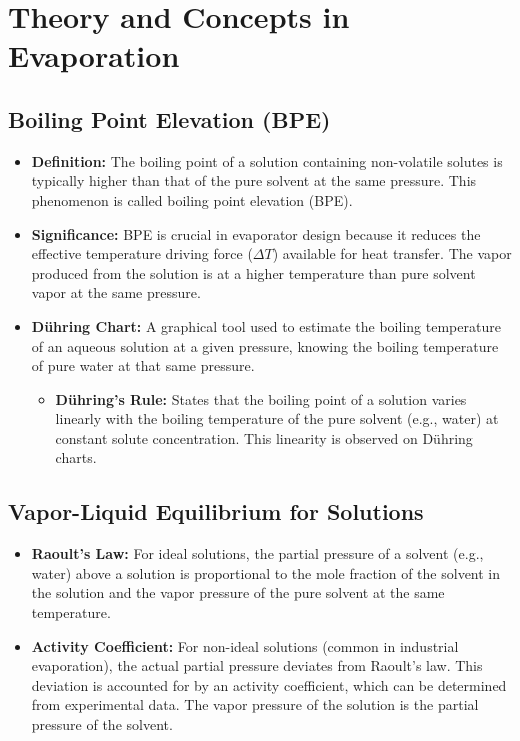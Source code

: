 \section{Theory and Concepts in Evaporation}

\subsection{Boiling Point Elevation (BPE)}
\begin{itemize}
    \item \textbf{Definition:} The boiling point of a solution containing non-volatile solutes is typically higher than that of the pure solvent at the same pressure. This phenomenon is called boiling point elevation (BPE).
    \item \textbf{Significance:} BPE is crucial in evaporator design because it reduces the effective temperature driving force ($\Delta T$) available for heat transfer. The vapor produced from the solution is at a higher temperature than pure solvent vapor at the same pressure.
    \item \textbf{Dühring Chart:} A graphical tool used to estimate the boiling temperature of an aqueous solution at a given pressure, knowing the boiling temperature of pure water at that same pressure.
        \begin{itemize}
            \item \textbf{Dühring's Rule:} States that the boiling point of a solution varies linearly with the boiling temperature of the pure solvent (e.g., water) at constant solute concentration. This linearity is observed on Dühring charts.
        \end{itemize}
\end{itemize}

\subsection{Vapor-Liquid Equilibrium for Solutions}
\begin{itemize}
    \item \textbf{Raoult's Law:} For ideal solutions, the partial pressure of a solvent (e.g., water) above a solution is proportional to the mole fraction of the solvent in the solution and the vapor pressure of the pure solvent at the same temperature.
    \item \textbf{Activity Coefficient:} For non-ideal solutions (common in industrial evaporation), the actual partial pressure deviates from Raoult's law. This deviation is accounted for by an activity coefficient, which can be determined from experimental data. The vapor pressure of the solution is the partial pressure of the solvent.
\end{itemize}

